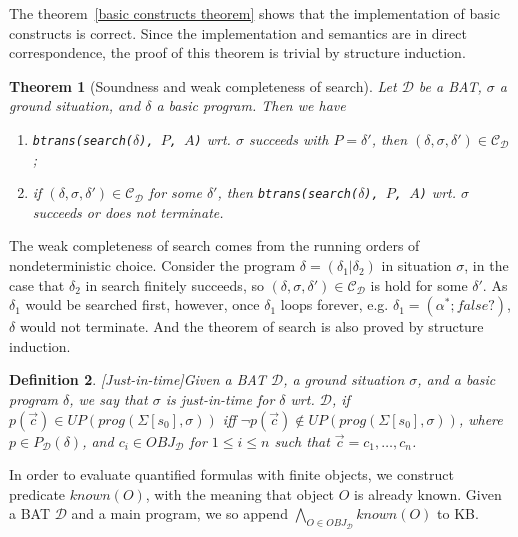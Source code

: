 \documentclass[letterpaper]{article}
\newtheorem{theorem}{Theorem}[section]
\newtheorem{DEFINITION}[theorem]{Definition}
\newenvironment{definition}{\begin{DEFINITION} \rm }
                            {\end{DEFINITION}}
\begin{document}
The theorem~\ref{basic constructs theorem} shows that the implementation of basic constructs is correct. Since the implementation and semantics are in direct correspondence, the proof of this theorem is trivial by structure induction.

\begin{theorem}[Soundness and weak completeness of search]\label{search theorem}
Let $\mathcal{D}$ be a BAT, $\sigma$ a ground situation, and $\delta$ a basic program. Then we have
\begin{enumerate}
  \item \texttt{btrans(search($\delta$), $P$, $A$)} wrt. $\sigma$ succeeds with $P = \delta'$, then $(\delta, \sigma, \delta') \in \mathcal{C_D}$;
  \item if $(\delta, \sigma, \delta') \in \mathcal{C_D}$ for some $\delta'$, then \texttt{btrans(search($\delta$), $P$, $A$)} wrt. $\sigma$ succeeds or does not terminate.
\end{enumerate}
\end{theorem}

The weak completeness of search comes from the running orders of nondeterministic choice. Consider the program $\delta=(\delta_1|\delta_2)$ in situation $\sigma$, in the case that $\delta_2$ in search finitely succeeds, so $(\delta,\sigma,\delta')\in\mathcal{C_D}$ is hold for some $\delta'$. As $\delta_1$ would be searched first, however, once $\delta_1$ loops forever, e.g. $\delta_1 =(\alpha^*;false?)$, $\delta$ would not terminate. And the theorem of search is also proved by structure induction.

\begin{definition}[Just-in-time]\label{just in time}
Given a BAT $\mathcal{D}$, a ground situation $\sigma$, and a basic program $\delta$, we say that $\sigma$ is \emph{just-in-time} for $\delta$ wrt. $\mathcal{D}$, if $p(\vec{c})\in UP(prog(\Sigma[s_0],\sigma))$ iff $\neg p(\vec{c})\not\in UP(prog(\Sigma[s_0],\sigma))$, where $p\in P_\mathcal{D}(\delta)$, and $c_i\in OBJ_\mathcal{D}$ for $1\leq i\leq n$ such that $\vec{c}=c_1,\ldots,c_n$.
\end{definition}

In order to evaluate quantified formulas with finite objects, we construct predicate $known(O)$, with the meaning that object $O$ is already known. Given a BAT $\mathcal{D}$ and a main program, we so append $\bigwedge_{O\in OBJ_\mathcal{D}} known(O)$ to KB.
\end{document}
